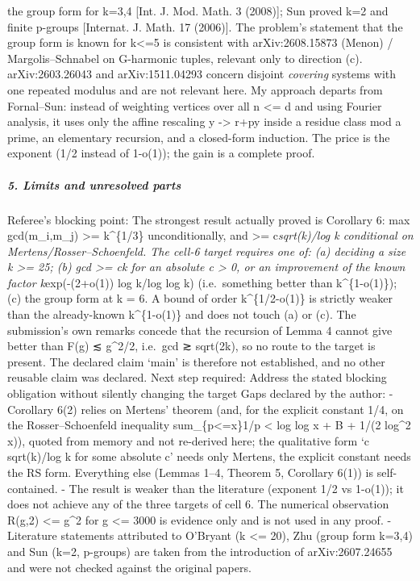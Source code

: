 \documentclass[11pt,a4paper]{article}
\begin{document}
\begin{itemize}
  the group form for k=3,4 {[}Int. J. Mod. Math. 3 (2008){]}; Sun proved
  k=2 and finite p-groups {[}Internat. J. Math. 17 (2006){]}. The
  problem's statement that the group form is known for k\textless=5 is
  consistent with arXiv:2608.15873 (Menon) / Margolis--Schnabel on
  G-harmonic tuples, relevant only to direction (c). arXiv:2603.26043
  and arXiv:1511.04293 concern disjoint \emph{covering} systems with one
  repeated modulus and are not relevant here. My approach departs from
  Fornal--Sun: instead of weighting vertices over all n \textless= d and
  using Fourier analysis, it uses only the affine rescaling y
  -\textgreater{} r+py inside a residue class mod a prime, an elementary
  recursion, and a closed-form induction. The price is the exponent (1/2
  instead of 1-o(1)); the gain is a complete proof.
\end{itemize}

\subparagraph{5. Limits and unresolved
parts}\label{limits-and-unresolved-parts}

Referee's blocking point: The strongest result actually proved is
Corollary 6: max gcd(m\_i,m\_j) \textgreater= k\^{}\{1/3\}
unconditionally, and \textgreater= c\emph{sqrt(k)/log k conditional on
Mertens/Rosser--Schoenfeld. The cell-6 target requires one of: (a)
deciding a size k \textgreater= 25; (b) gcd \textgreater= ck for an
absolute c \textgreater{} 0, or an improvement of the known factor
k}exp(-(2+o(1)) log k/log log k) (i.e.~something better than
k\^{}\{1-o(1)\}); (c) the group form at k = 6. A bound of order
k\^{}\{1/2-o(1)\} is strictly weaker than the already-known
k\^{}\{1-o(1)\} and does not touch (a) or (c). The submission's own
remarks concede that the recursion of Lemma 4 cannot give better than
F(g) ≲ g\^{}2/2, i.e.~gcd ≳ sqrt(2k), so no route to the target is
present. The declared claim `main' is therefore not established, and no
other reusable claim was declared. Next step required: Address the
stated blocking obligation without silently changing the target Gaps
declared by the author: - Corollary 6(2) relies on Mertens' theorem
(and, for the explicit constant 1/4, on the Rosser--Schoenfeld
inequality sum\_\{p\textless=x\}1/p \textless{} log log x + B + 1/(2
log\^{}2 x)), quoted from memory and not re-derived here; the
qualitative form `c sqrt(k)/log k for some absolute c' needs only
Mertens, the explicit constant needs the RS form. Everything else
(Lemmas 1--4, Theorem 5, Corollary 6(1)) is self-contained. - The result
is weaker than the literature (exponent 1/2 vs 1-o(1)); it does not
achieve any of the three targets of cell 6. The numerical observation
R(g,2) \textless= g\^{}2 for g \textless= 3000 is evidence only and is
not used in any proof. - Literature statements attributed to O'Bryant (k
\textless= 20), Zhu (group form k=3,4) and Sun (k=2, p-groups) are taken
from the introduction of arXiv:2607.24655 and were not checked against
the original papers.
\end{document}
